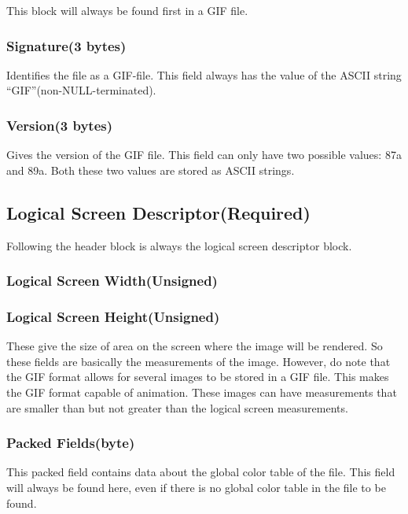 This block will always be found first in a GIF file.

\subsubsection*{Signature(3 bytes)}

Identifies the file as a GIF-file. This field always has the value of
the ASCII string ``GIF''(non-NULL-terminated).

\subsubsection{Version(3 bytes)}

Gives the version of the GIF file. This field can only have two
possible values: 87a and 89a. Both these two values are stored as
ASCII strings.

\subsection{Logical Screen Descriptor(Required)}

Following the header block is always the logical screen descriptor
block.

\subsubsection{Logical Screen Width(Unsigned)}
\subsubsection{Logical Screen Height(Unsigned)}

These give the size of area on the screen where the image will be
rendered. So these fields are basically the measurements of the
image. However, do note that the GIF format allows for several images
to be stored in a GIF file. This makes the GIF format capable of
animation. These images can have measurements that are smaller than
but not greater than the logical screen measurements.

\subsubsection{Packed Fields(byte)}

This packed field contains data about the global color table of the
file. This field will always be found here, even if there is no global
color table in the file to be found.

